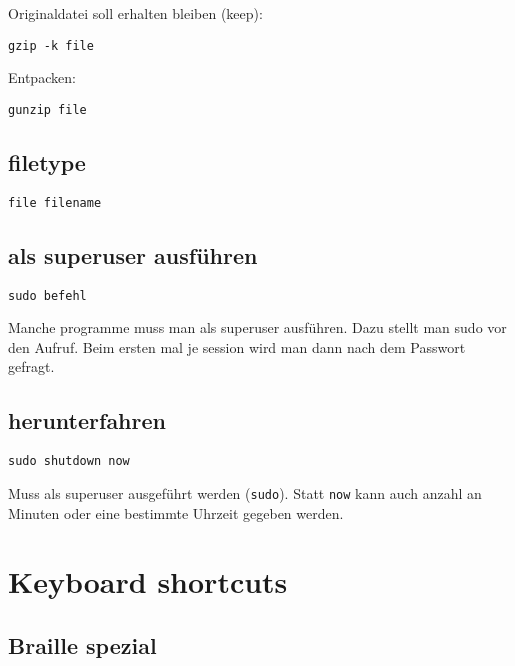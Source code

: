 \documentclass[]{book}
\begin{document}
Originaldatei soll erhalten bleiben (keep):

\begin{verbatim}
gzip -k file
\end{verbatim}

Entpacken:

\begin{verbatim}
gunzip file
\end{verbatim}

\hypertarget{filetype}{%
\section{filetype}\label{filetype}}

\begin{verbatim}
file filename
\end{verbatim}

\hypertarget{als-superuser-ausfuhren}{%
\section{als superuser ausführen}\label{als-superuser-ausfuhren}}

\begin{verbatim}
sudo befehl
\end{verbatim}

Manche programme muss man als superuser ausführen. Dazu stellt man sudo vor den Aufruf. Beim ersten mal je session wird man dann nach dem Passwort gefragt.

\hypertarget{herunterfahren}{%
\section{herunterfahren}\label{herunterfahren}}

\begin{verbatim}
sudo shutdown now
\end{verbatim}

Muss als superuser ausgeführt werden (\texttt{sudo}). Statt \texttt{now} kann auch anzahl an Minuten oder eine bestimmte Uhrzeit gegeben werden.

\hypertarget{keyboard-shortcuts}{%
\chapter{Keyboard shortcuts}\label{keyboard-shortcuts}}

\hypertarget{braille-spezial}{%
\section{Braille spezial}\label{braille-spezial}}
\end{document}
